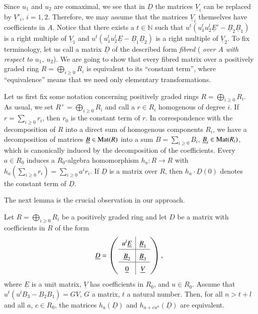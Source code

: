 Since $u_{1}$ and $u_{2}$ are comaximal, we see that in
$\underline{D}$ the matrices $\underline{V}_{i}$ can be replaced by
$\underline{V}'_{i}$, $i=1,2$. Therefore, we may assume that the
matrices $\underline{V}_{i}$ themselves have coefficients in
$A$. Notice that there exists a $t\in \mathbb{N}$ such that
$u^{t}(u^{l}_{1}u^{l}_{2}\underline{E}'-\underline{B}_{2}\underline{B}_{1})$
is a right multiple of $\underline{V}_{1}$ and\pageoriginale
$u^{t}(u^{l}_{1}u^{l}_{2}\underline{E}-\underline{B}_{1}\underline{B}_{2})$
is a right multiple of $\underline{V}_{2}$. To fix terminology, let us
call a matrix $\underline{D}$ of the described form {\em fibred} ({\em
over $A$ with respect to $u_{1}$, $u_{2}$}). We are going to show that
every fibred matrix over a positively graded ring
$R=\bigoplus\limits_{i\geq 0}R_{i}$ is equivalent to its ``constant
term'', where ``equivalence'' means that we need only elementary
transformations. 

Let us first fix some notation concerning positively graded rings
$R=\bigoplus\limits_{i\geq 0} R_{i}$. As usual, we set
$R^{+}=\bigoplus\limits_{i\geq 0}R_{i}$ and call a $r\in R_{i}$
homogenous of degree $i$. If $r=\sum\limits_{i\geq 0}r_{i}$, then
$r_{0}$ is the constant term of $r$. In correspondence with the
decomposition of $R$ into a direct sum of homogenous components
$R_{i}$, we have a decomposition of matrices
$\underline{B}\in \operatorname{Mat}(R)$ into a sum $B=\sum\limits_{i\geq 0}B_{i}$,
$\underline{B}_{i}\in \operatorname{Mat}(R_{i})$, which is canonically induced by
the decomposition of the coefficients. Every $a\in R_{0}$ induces a
$R_{0}$-algebra homomorphism $h_{a}:R\to R$ with
$h_{a}\left(\sum\limits_{i\geq 0}r_{i}\right)=\sum\limits_{i\geq
0}a^{i}r_{i}$. If $\underline{D}$ is a matrix over $R$, then
$h_{a}\cdot \underline{D}(0)$ denotes the constant term of
$\underline{D}$. 

The next lemma is the crucial observation in our approach.

\begin{sublem}\label{chap10-lem1.1}
Let $R=\bigoplus\limits_{i\geq 0}R_{i}$ be a positively graded ring
and let $D$ be a matrix with coefficients in $R$ of the form 
$$
\underline{D}=
\left(
\renewcommand{\arraystretch}{1.5}
\begin{array}{c|c}
u^{l}\underline{E} & \underline{B}_{1}\\
\hline
\underline{B}_{2} & \underline{B}_{3}\\
\hline
\underline{0} & \underline{V}
\end{array}
\right),
$$\pageoriginale
where $\underline{E}$ is a unit matrix, $\underline{V}$ has
coefficients in $R_{0}$, and $u\in R_{0}$. Assume that
$u^{t}(u^{l}B_{3}-B_{2}B_{1})=GV$, $G$ a matrix, $t$ a natural
number. Then, for all $n>t+l$ and all $a$, $c\in R_{0}$, the matrices
$h_{a}(\underline{D})$ and $h_{a+cu^{n}}(\underline{D})$ are
equivalent. 
\end{sublem}

